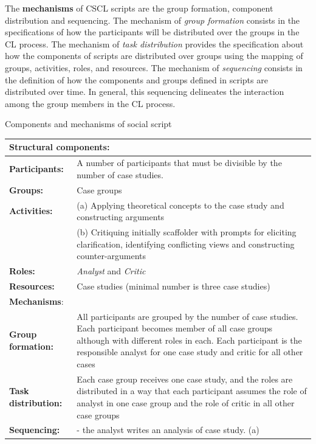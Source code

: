 The \textbf{mechanisms} of CSCL scripts are the group formation, component distribution and sequencing.
The mechanism of \emph{group formation} consists in the specifications of how the participants will be distributed over the groups in the CL process.
The mechanism of \emph{task distribution} provides the specification about how the components of scripts are distributed over groups using the mapping of groups, activities, roles, and resources.
The mechanism of \emph{sequencing} consists in the definition of how the components and groups defined in scripts are distributed over time.
In general, this sequencing delineates the interaction among the group members in the CL process.

\begin{quadro}[htb]
\caption{Components and mechanisms of social script}
\label{qua:social-script-framework-kobbe}
\centering
\footnotesize
\begin{tabular}{l p{12cm}}
\toprule
\multicolumn{2}{l}{\textbf{Structural components:}} \\ \midrule
\textbf{Participants:} &
A number of participants that must be divisible by the number of case studies.  \\
\textbf{Groups:} &
Case groups \\
\textbf{Activities:} &
(a) Applying theoretical concepts to the case study and constructing arguments \\
 &
(b) Critiquing initially scaffolder with prompts for eliciting clarification, identifying conflicting views and constructing counter-arguments \\
\textbf{Roles:} &
\emph{Analyst} and \emph{Critic} \\
\textbf{Resources:} &
Case studies (minimal number is three case studies) \\
\toprule
\multicolumn{2}{l}{\textbf{Mechanisms}:} \\ \midrule
\textbf{Group formation:} &
All participants are grouped by the number of case studies. Each participant becomes member of all case groups although with different roles in each. Each participant is the responsible analyst for one case study and critic for all other cases \\
\textbf{Task distribution:} &
Each case group receives one case study, and the roles are distributed in a way that each participant assumes the role of analyst in one case group and the role of critic in all other case groups \\
\textbf{Sequencing:}
& - the analyst writes an analysis of case study. (a) \\

\end{tabular}
\end{quadro}
